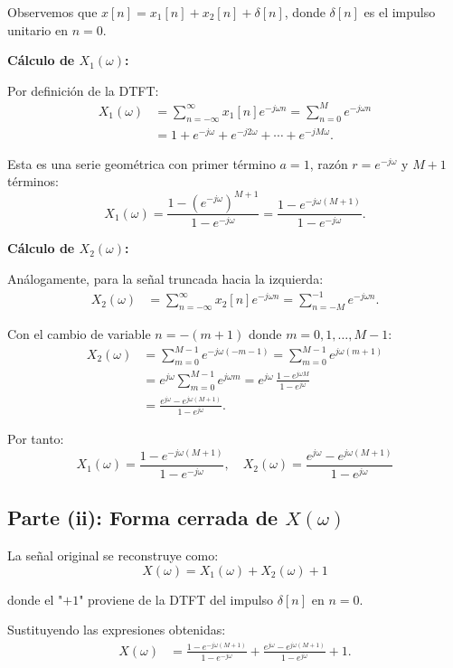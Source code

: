 \documentclass[
  11pt,
  letterpaper,
   addpoints,
   answers
  ]{exam}
\begin{document}
\begin{questions}
\begin{solution}
Observemos que $x[n] = x_1[n] + x_2[n] + \delta[n]$, donde $\delta[n]$ es el impulso unitario en $n=0$.

\textbf{Cálculo de $X_1(\omega)$:}

Por definición de la DTFT:
\begin{align}
X_1(\omega) &= \sum_{n=-\infty}^{\infty} x_1[n]e^{-j\omega n} = \sum_{n=0}^{M}e^{-j\omega n} \\
&= 1+e^{-j\omega}+e^{-j2\omega}+\cdots+e^{-jM\omega}.
\end{align}

Esta es una serie geométrica con primer término $a=1$, razón $r=e^{-j\omega}$ y $M+1$ términos:
\[
X_1(\omega) = \frac{1 - (e^{-j\omega})^{M+1}}{1 - e^{-j\omega}} = \frac{1 - e^{-j\omega(M+1)}}{1 - e^{-j\omega}}.
\]

\textbf{Cálculo de $X_2(\omega)$:}

Análogamente, para la señal truncada hacia la izquierda:
\begin{align}
X_2(\omega) &= \sum_{n=-\infty}^{\infty} x_2[n]e^{-j\omega n} = \sum_{n=-M}^{-1}e^{-j\omega n}.
\end{align}

Con el cambio de variable $n=-(m+1)$ donde $m=0,1,\ldots,M-1$:
\begin{align}
X_2(\omega) &= \sum_{m=0}^{M-1}e^{-j\omega(-m-1)} = \sum_{m=0}^{M-1}e^{j\omega(m+1)} \\
&= e^{j\omega}\sum_{m=0}^{M-1}e^{j\omega m} = e^{j\omega}\,\frac{1-e^{j\omega M}}{1-e^{j\omega}} \\
&= \frac{e^{j\omega}-e^{j\omega(M+1)}}{1-e^{j\omega}}.
\end{align}

Por tanto:
\[
\boxed{
X_1(\omega) = \frac{1-e^{-j\omega(M+1)}}{1-e^{-j\omega}}, \quad
X_2(\omega) = \frac{e^{j\omega}-e^{j\omega(M+1)}}{1-e^{j\omega}}
}
\]

\subsection*{Parte (ii): Forma cerrada de $X(\omega)$}

La señal original se reconstruye como:
\[
X(\omega) = X_1(\omega) + X_2(\omega) + 1
\]

donde el "$+1$" proviene de la DTFT del impulso $\delta[n]$ en $n=0$.

Sustituyendo las expresiones obtenidas:
\begin{align}
X(\omega) &= \frac{1-e^{-j\omega(M+1)}}{1-e^{-j\omega}} + \frac{e^{j\omega}-e^{j\omega(M+1)}}{1-e^{j\omega}} + 1.
\end{align}


\end{solution}
\end{questions}
\end{document}
